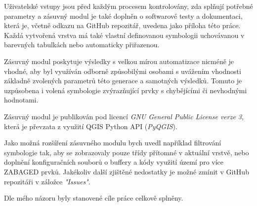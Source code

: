 \documentclass[a4paper,oneside,12pt]{book}
\begin{document}
\hspace{10mm} Uživatelské vstupy jsou před každým procesem kontrolovány, zda splňují potřebné parametry a zásuvný modul je také doplněn o softwarové testy a dokumentaci, která je, včetně odkazu na GitHub repozitář, uvedena jako příloha této práce. Každá vytvořená vrstva má také vlastní definovanou symbologii uchovávanou v barevných tabulkách nebo automaticky přiřazenou.

\hspace{10mm} Zásuvný modul poskytuje výsledky s velkou mírou automatizace nicméně je vhodné, aby byl využíván odborně způsobilými osobami s uvážením vhodnosti základně zvolených parametrů této generace a samotných výsledků. Tomuto je uzpůsobena i volená symbologie zvýrazňující prvky s chybějícími či nevhodnými hodnotami.

\hspace{10mm} Zásuvný modul je publikován pod licencí \textit{GNU General Public License verze 3}, která je převzata z využití QGIS Python API (\textit{PyQGIS}).

\hspace{10mm} Jako možná rozšíření zásuvného modulu bych uvedl například filtrování symbologie tak, aby se zobrazovaly pouze třídy přítomné v aktuální vrstvě, nebo doplnění konfiguračních souborů o buffery a kódy využití území pro více ZABAGED prvků. Jakékoliv další zjištěné nedostatky je možné zmínit v GitHub repozitáři v záložce \textit{"Issues"}.

\hspace{10mm} Dle mého názoru byly stanovené cíle práce celkově splněny.

\clearpage  %
  \label{zdroje}
\end{document}
